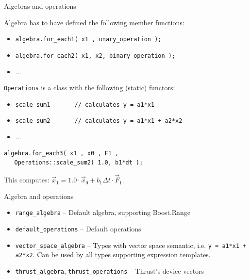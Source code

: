 \documentclass{beamer}
\newcommand{\heading}[1]{\centerline{\Large #1} \vspace{0.5em}}
\begin{document}
\begin{frame}[fragile]
 \heading{Algebras and operations}

\vspace{1ex}
Algebra has to have defined the following member functions:

\begin{itemize}
 \item \lstinline+algebra.for_each1( x1 , unary_operation );+
 \item \lstinline+algebra.for_each2( x1, x2, binary_operation );+
 \item ...
\end{itemize}

\vspace{2ex}

\lstinline+Operations+ is a class with the following (static) functors:
\begin{itemize}
 \item \lstinline+scale_sum1       // calculates y = a1*x1+
 \item \lstinline{scale_sum2       // calculates y = a1*x1 + a2*x2}
 \item ...
\end{itemize}

\vspace{2ex}
\begin{lstlisting}
algebra.for_each3( x1 , x0 , F1 ,
   Operations::scale_sum2( 1.0, b1*dt );
\end{lstlisting}

This computes: $\vec x_1 = 1.0\cdot \vec x_0 + b_1\Delta t\cdot \vec F_1$.
\end{frame}




\begin{frame}[fragile]
 \heading{Algebra and operations}

 \begin{itemize}
  \item {\tt range\_algebra} -- Default algebra, supporting Boost.Range
  \item {\tt default\_operations} -- Default operations
  \item {\tt vector\_space\_algebra} -- Types with vector space
    semantic, i.e. \lstinline{y = a1*x1 + a2*x2}. Can be used by all
    types supporting expression templates.
  \item {\tt thrust\_algebra}, {\tt thrust\_operations} -- Thrust's device vectors
 \end{itemize}

\end{frame}
\end{document}
